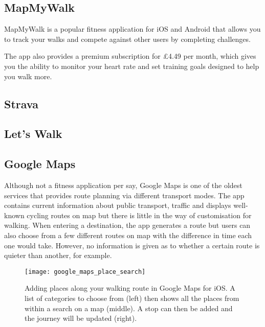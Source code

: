 
\subsection{MapMyWalk}

MapMyWalk \cite{Map} is a popular fitness application for iOS and Android that allows you to track your walks and compete against other users by completing challenges. 

The app also provides a premium subscription for \pounds4.49 per month, which gives you the ability to monitor your heart rate and set training goals designed to help you walk more.

\subsection{Strava}

\subsection{Let's Walk}

\subsection{Google Maps}

Although not a fitness application per say, Google Maps \cite{GoogleInc.} is one of the oldest services that provides route planning via different transport modes. The app contains current information about public transport, traffic and displays well-known cycling routes on map but there is little in the way of customisation for walking. When entering a destination, the app generates a route but users can also choose from a few different routes on map with the difference in time each one would take. However, no information is given as to whether a certain route is quieter than another, for example.


\begin{figure}[hbt]
  \centering
  \texttt{[image: google\_maps\_place\_search]}
  \caption{Adding places along your walking route in Google Maps for iOS. A list of categories to choose from (left) then shows all the places from within a search on a map (middle). A stop can then be added and the journey will be updated (right).}
  \label{google_maps_place_search}
\end{figure}


